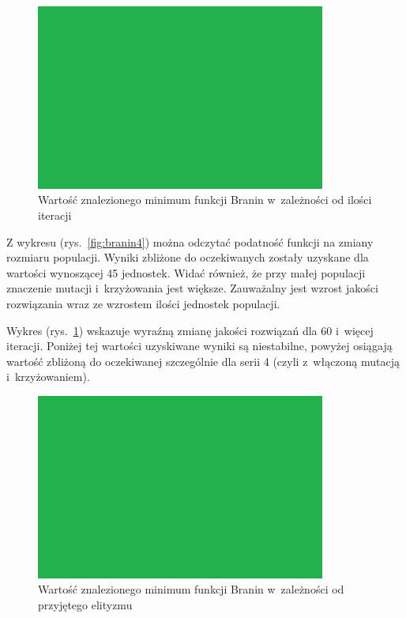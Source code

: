 \documentclass[11pt, a4paper]{article}
\newcommand{\fbi}{\leavevmode{\parindent=1em\indent}}
\begin{document}
\begin{figure}[H]
	\centering
	\includegraphics[width=0.85\textwidth]{./assets/test.png}
	\caption{Wartość znalezionego minimum funkcji Branin w~zależności od ilości iteracji}
	\label{fig:branin5}
\end{figure}

\fbi
Z wykresu (rys.~\ref{fig:branin4}) można odczytać podatność funkcji na zmiany rozmiaru populacji. Wyniki zbliżone do oczekiwanych zostały uzyskane dla wartości wynoszącej 45 jednostek. Widać również, że przy małej populacji znaczenie mutacji i~krzyżowania jest większe. Zauważalny jest wzrost jakości rozwiązania wraz ze wzrostem ilości jednostek populacji.

\fbi
Wykres (rys.~\ref{fig:branin5}) wskazuje wyraźną zmianę jakości rozwiązań dla 60 i~więcej iteracji. Poniżej tej wartości uzyskiwane wyniki są niestabilne, powyżej osiągają wartość zbliżoną do oczekiwanej szczególnie dla serii 4 (czyli z~włączoną mutacją i~krzyżowaniem).

\begin{figure}[H]
	\centering
	\includegraphics[width=0.85\textwidth]{./assets/test.png}
	\caption{Wartość znalezionego minimum funkcji Branin w~zależności od przyjętego elityzmu}
	\label{fig:branin6}
\end{figure}
\end{document}
